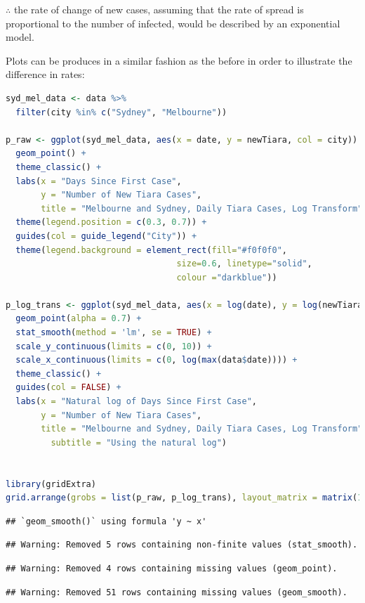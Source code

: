 \documentclass{article}
\begin{document}
\(\therefore\) the rate of change of new cases, assuming that the rate
of spread is proportional to the number of infected, would be described
by an exponential model.

Plots can be produces in a similar fashion as the before in order to
illustrate the difference in rates:

\begin{lstlisting}[language=R]
syd_mel_data <- data %>% 
  filter(city %in% c("Sydney", "Melbourne"))

p_raw <- ggplot(syd_mel_data, aes(x = date, y = newTiara, col = city)) +
  geom_point() +
  theme_classic() +
  labs(x = "Days Since First Case",
       y = "Number of New Tiara Cases",
       title = "Melbourne and Sydney, Daily Tiara Cases, Log Transform") +
  theme(legend.position = c(0.3, 0.7)) +
  guides(col = guide_legend("City")) +
  theme(legend.background = element_rect(fill="#f0f0f0",
                                  size=0.6, linetype="solid",
                                  colour ="darkblue"))

p_log_trans <- ggplot(syd_mel_data, aes(x = log(date), y = log(newTiara), col = city)) +
  geom_point(alpha = 0.7) +
  stat_smooth(method = 'lm', se = TRUE) +
  scale_y_continuous(limits = c(0, 10)) +
  scale_x_continuous(limits = c(0, log(max(data$date)))) +
  theme_classic() +
  guides(col = FALSE) +
  labs(x = "Natural log of Days Since First Case",
       y = "Number of New Tiara Cases",
       title = "Melbourne and Sydney, Daily Tiara Cases, Log Transform",
         subtitle = "Using the natural log")


library(gridExtra)
grid.arrange(grobs = list(p_raw, p_log_trans), layout_matrix = matrix(1:2, nrow = 1))
\end{lstlisting}

\begin{lstlisting}
## `geom_smooth()` using formula 'y ~ x'
\end{lstlisting}

\begin{lstlisting}
## Warning: Removed 5 rows containing non-finite values (stat_smooth).
\end{lstlisting}

\begin{lstlisting}
## Warning: Removed 4 rows containing missing values (geom_point).
\end{lstlisting}

\begin{lstlisting}
## Warning: Removed 51 rows containing missing values (geom_smooth).
\end{lstlisting}
\end{document}
